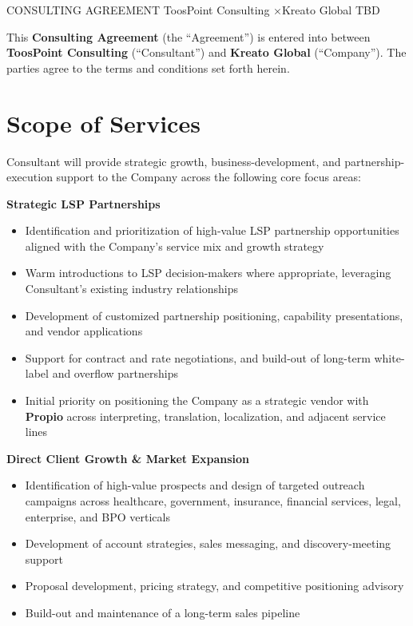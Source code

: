 \documentclass{toospoint}
\begin{document}
\contracttitle
  {CONSULTING AGREEMENT}
  {ToosPoint Consulting \quad×\quad Kreato Global}
  {TBD}

\begin{clausebox}
\sffamily\small
This \textbf{Consulting Agreement} (the ``Agreement'') is entered into between
\textbf{ToosPoint Consulting} (``Consultant'') and \textbf{Kreato Global}
(``Company''). The parties agree to the terms and conditions set forth herein.
\end{clausebox}

\vspace{10pt}

\section{Scope of Services}

Consultant will provide strategic growth, business-development, and
partnership-execution support to the Company across the following core focus
areas:

\vspace{4pt}
\noindent\textbf{\color{TPDark}Strategic LSP Partnerships}
\begin{itemize}[leftmargin=1.5em, itemsep=2pt, topsep=2pt]
  \item Identification and prioritization of high-value LSP partnership opportunities aligned with the Company's service mix and growth strategy
  \item Warm introductions to LSP decision-makers where appropriate, leveraging Consultant's existing industry relationships
  \item Development of customized partnership positioning, capability presentations, and vendor applications
  \item Support for contract and rate negotiations, and build-out of long-term white-label and overflow partnerships
  \item Initial priority on positioning the Company as a strategic vendor with \textbf{Propio} across interpreting, translation, localization, and adjacent service lines
\end{itemize}

\vspace{4pt}
\noindent\textbf{\color{TPDark}Direct Client Growth \& Market Expansion}
\begin{itemize}[leftmargin=1.5em, itemsep=2pt, topsep=2pt]
  \item Identification of high-value prospects and design of targeted outreach campaigns across healthcare, government, insurance, financial services, legal, enterprise, and BPO verticals
  \item Development of account strategies, sales messaging, and discovery-meeting support
  \item Proposal development, pricing strategy, and competitive positioning advisory
  \item Build-out and maintenance of a long-term sales pipeline
\end{itemize}
\end{document}
